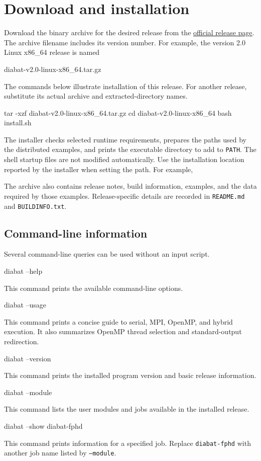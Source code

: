 \section{Download and installation}\label{sec-install}
Download the binary archive for the desired release from the \href{https://github.com/laughtale-lab/diabat/releases}{official release page}. The archive filename includes its version number. For example, the version 2.0 Linux x86\_64 release is named
\begin{lst-installation}
diabat-v2.0-linux-x86_64.tar.gz
\end{lst-installation}

The commands below illustrate installation of this release. For another release, substitute its actual archive and extracted-directory names.
\begin{lst-installation}
tar -xzf diabat-v2.0-linux-x86_64.tar.gz
cd diabat-v2.0-linux-x86_64
bash install.sh
\end{lst-installation}
The installer checks selected runtime requirements, prepares the paths used by the distributed examples, and prints the executable directory to add to \texttt{PATH}. The shell startup files are not modified automatically. Use the installation location reported by the installer when setting the path. For example,
The archive also contains release notes, build information, examples, and the data required by those examples. Release-specific details are recorded in \texttt{README.md} and \texttt{BUILDINFO.txt}.

\subsection{Command-line information}
Several command-line queries can be used without an input script.
\begin{lst-installation}
diabat --help
\end{lst-installation}
This command prints the available command-line options.
\begin{lst-installation}
diabat --usage
\end{lst-installation}
This command prints a concise guide to serial, MPI, OpenMP, and hybrid execution. It also summarizes OpenMP thread selection and standard-output redirection.
\begin{lst-installation}
diabat --version
\end{lst-installation}
This command prints the installed program version and basic release information.
\begin{lst-installation}
diabat --module
\end{lst-installation}
This command lists the user modules and jobs available in the installed release.
\begin{lst-installation}
diabat --show diabat-fphd
\end{lst-installation}
This command prints information for a specified job. Replace \texttt{diabat-fphd} with another job name listed by \texttt{--module}.

